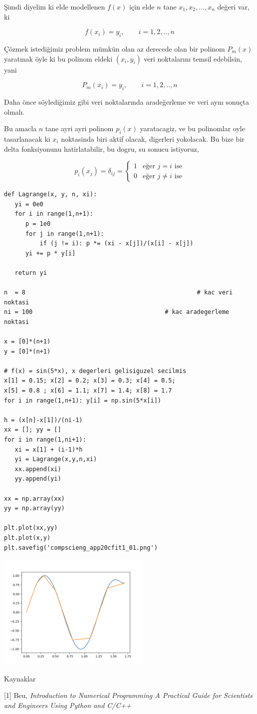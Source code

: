 \documentclass[12pt,fleqn]{article}\usepackage{../../common}
\begin{document}
Şimdi diyelim ki elde modellenen $f(x)$ için elde $n$ tane $x_1,x_2,...,x_n$
değeri var, ki

$$
f(x_i) = y_i, \qquad i=1,2,..,n
$$

Çözmek istediğimiz problem mümkün olan az derecede olan bir polinom $P_m(x)$
yaratmak öyle ki bu polinom eldeki $(x_i,y_i)$ veri noktalarını temsil
edebilsin, yani

$$
P_m(x_i) = y_i, \qquad i=1,2,..,n
$$

Daha önce söylediğimiz gibi veri noktalarında aradeğerleme ve veri aynı sonuçta
olmalı.

Bu amacla $n$ tane ayri ayri polinom $p_i(x)$ yaratacagiz, ve bu polinomlar
oyle tasarlanacak ki $x_i$ noktasinda biri aktif olacak, digerleri yokolacak.
Bu bize bir delta fonksiyonunu hatirlatabilir, bu dogru, su sonucu istiyoruz,

$$
p_i(x_j) = \delta_{ij} =
\left\{ \begin{array}{ll}
1 & \textrm{eğer } j = i \textrm{ ise} \\
0 & \textrm{eğer } j\ne i \textrm{ ise}
\end{array} \right.
$$










\begin{verbatim}
def Lagrange(x, y, n, xi):
   yi = 0e0
   for i in range(1,n+1):
      p = 1e0
      for j in range(1,n+1):
          if (j != i): p *= (xi - x[j])/(x[i] - x[j])
      yi += p * y[i]

   return yi

n  = 8                                                # kac veri noktasi
ni = 100                                     # kac aradegerleme noktasi

x = [0]*(n+1)                                                   
y = [0]*(n+1)

# f(x) = sin(5*x), x degerleri gelisiguzel secilmis 
x[1] = 0.15; x[2] = 0.2; x[3] = 0.3; x[4] = 0.5;
x[5] = 0.8 ; x[6] = 1.1; x[7] = 1.4; x[8] = 1.7
for i in range(1,n+1): y[i] = np.sin(5*x[i])

h = (x[n]-x[1])/(ni-1)
xx = []; yy = []
for i in range(1,ni+1):
   xi = x[1] + (i-1)*h                          
   yi = Lagrange(x,y,n,xi) 
   xx.append(xi)
   yy.append(yi)

xx = np.array(xx)
yy = np.array(yy)

plt.plot(xx,yy)
plt.plot(x,y)
plt.savefig('compscieng_app20cfit1_01.png')
\end{verbatim}

\includegraphics[width=20em]{compscieng_app20cfit1_01.png}

Kaynaklar

[1] Beu, {\em Introduction to Numerical Programming A Practical Guide for Scientists and Engineers Using Python and C/C++}
\end{document}
